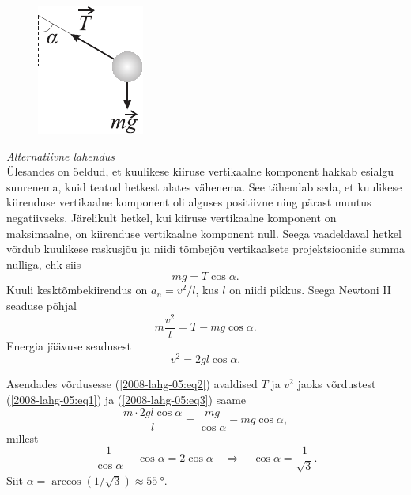 {\begin{figure}
	\begin{center}
		\includegraphics[width=0.95\linewidth]{2008-lahg-05-lah}
	\end{center}
\end{figure}
\emph{Alternatiivne lahendus}\\
Ülesandes on öeldud, et kuulikese kiiruse vertikaalne komponent
hakkab esialgu suurenema, kuid teatud hetkest alates vähenema.
See tähendab seda, et kuulikese kiirenduse vertikaalne komponent oli alguses positiivne ning pärast muutus negatiivseks. Järelikult hetkel, kui kiiruse vertikaalne komponent on maksimaalne, on kiirenduse vertikaalne komponent null. Seega vaadeldaval
hetkel võrdub kuulikese raskusjõu ju niidi tõmbejõu vertikaalsete
projektsioonide summa nulliga, ehk siis
\begin{equation} \label{2008-lahg-05:eq1}
mg = T \cos \alpha.
\end{equation}
Kuuli kesktõmbekiirendus on $a_n = v^2/l$, kus $l$ on niidi pikkus. Seega Newtoni II
seaduse põhjal
\begin{equation} \label{2008-lahg-05:eq2}
m\frac{v^2}{l} = T - mg \cos \alpha.
\end{equation}
Energia jäävuse seadusest
\begin{equation} \label{2008-lahg-05:eq3}
v^2 = 2gl \cos \alpha.
\end{equation}

Asendades võrdusesse (\ref{2008-lahg-05:eq2}) avaldised $T$ ja $v^2$
jaoks võrdustest (\ref{2008-lahg-05:eq1}) ja (\ref{2008-lahg-05:eq3}) saame
\[
\frac{m \cdot 2 g l \cos \alpha}{l}=\frac{m g}{\cos \alpha}-m g \cos \alpha,
\]
millest
\[
\frac{1}{\cos \alpha}-\cos \alpha=2 \cos \alpha \quad \Rightarrow\quad \cos \alpha=\frac{1}{\sqrt{3}}.
\]
Siit $\alpha = \arccos \left( 1/ \sqrt 3\right) \approx \SI{55}{\degree}$.
\fi
}